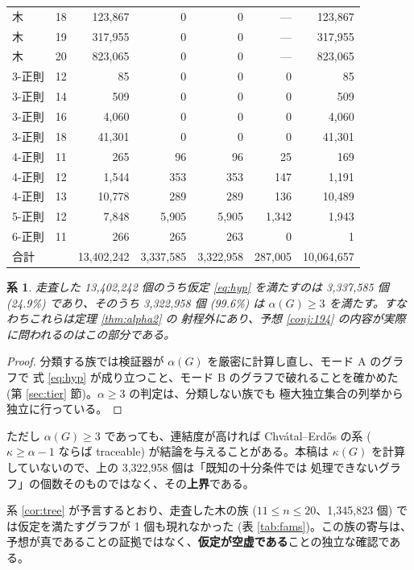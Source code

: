 \documentclass[paper=a4,fontsize=10.5pt,jafontsize=10.5pt]{jlreq}
\theoremstyle{plain}
\newtheorem{corollary}[theorem]{系}
\theoremstyle{definition}
\begin{document}
\begin{table}[htbp]
\begin{tabular}{lrrrrrr}
木 & 18 & 123,867 & 0 & 0 & --- & 123,867 \\
木 & 19 & 317,955 & 0 & 0 & --- & 317,955 \\
木 & 20 & 823,065 & 0 & 0 & --- & 823,065 \\
3-正則 & 12 & 85 & 0 & 0 & 0 & 85 \\
3-正則 & 14 & 509 & 0 & 0 & 0 & 509 \\
3-正則 & 16 & 4,060 & 0 & 0 & 0 & 4,060 \\
3-正則 & 18 & 41,301 & 0 & 0 & 0 & 41,301 \\
4-正則 & 11 & 265 & 96 & 96 & 25 & 169 \\
4-正則 & 12 & 1,544 & 353 & 353 & 147 & 1,191 \\
4-正則 & 13 & 10,778 & 289 & 289 & 136 & 10,489 \\
5-正則 & 12 & 7,848 & 5,905 & 5,905 & 1,342 & 1,943 \\
6-正則 & 11 & 266 & 265 & 263 & 0 & 1 \\
\midrule
\multicolumn{2}{l}{合計} & 13,402,242 & 3,337,585 & 3,322,958 &
287,005 & 10,064,657 \\
\bottomrule
\end{tabular}
\end{table}

\begin{corollary}\label{cor:beyond}
走査した 13,402,242 個のうち仮定 \eqref{eq:hyp} を満たすのは 3,337,585 個
(24.9\%) であり、そのうち 3,322,958 個 (99.6\%) は
$\alpha(G) \ge 3$ を満たす。すなわちこれらは定理 \ref{thm:alpha2} の
射程外にあり、予想 \ref{conj:194} の内容が実際に問われるのはこの部分である。
\end{corollary}

\begin{proof}
分類する族では検証器が $\alpha(G)$ を厳密に計算し直し、モード A のグラフで
式 \eqref{eq:hyp} が成り立つこと、モード B のグラフで破れることを確かめた
(第 \ref{sec:tier} 節)。$\alpha \ge 3$ の判定は、分類しない族でも
極大独立集合の列挙から独立に行っている。
\end{proof}

ただし $\alpha(G) \ge 3$ であっても、連結度が高ければ Chvátal--Erdős の系
($\kappa \ge \alpha - 1$ ならば traceable) が結論を与えることがある。本稿は
$\kappa(G)$ を計算していないので、上の 3,322,958 個は「既知の十分条件では
処理できないグラフ」の個数そのものではなく、その\textbf{上界}である。

系 \ref{cor:tree} が予言するとおり、走査した木の族 ($11 \le n \le 20$、1,345,823 個) では仮定を満たすグラフが 1 個も現れなかった (表 \ref{tab:fams})。この族の寄与は、予想が真であることの証拠ではなく、\textbf{仮定が空虚である}ことの独立な確認である。
\end{document}
